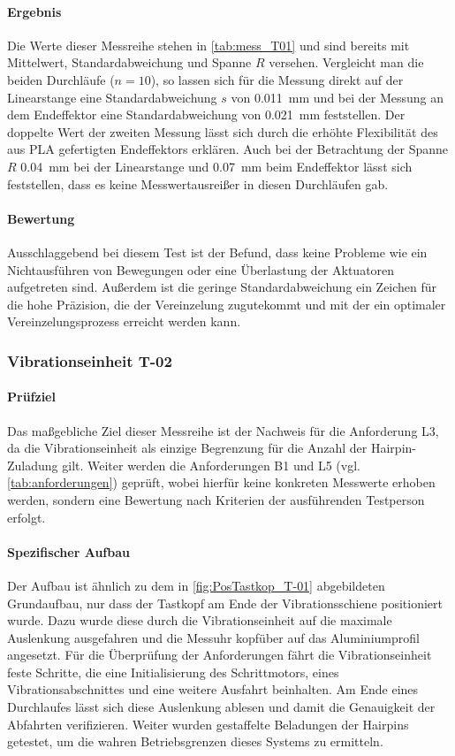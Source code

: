 \paragraph{Ergebnis}
Die Werte dieser Messreihe stehen in \cref{tab:mess_T01} und sind bereits mit Mittelwert, Standardabweichung und Spanne $R$ versehen.
Vergleicht man die beiden Durchläufe ($n = 10$), so lassen sich für die Messung direkt auf der Linearstange eine Standardabweichung $s$
von \qty{0.011}{\milli\meter} und bei der Messung an dem Endeffektor eine Standardabweichung von \qty{0.021}{\milli\meter} feststellen.
Der doppelte Wert der zweiten Messung lässt sich durch die erhöhte Flexibilität des aus PLA gefertigten Endeffektors erklären. Auch bei der
Betrachtung der Spanne $R$ \qty{0.04}{\milli\meter} bei der Linearstange und \qty{0.07}{\milli\meter} beim Endeffektor lässt sich
feststellen, dass es keine Messwertausreißer in diesen Durchläufen gab.

\paragraph{Bewertung}
Ausschlaggebend bei diesem Test ist der Befund, dass keine Probleme wie ein Nichtausführen von Bewegungen oder eine Überlastung
der Aktuatoren aufgetreten sind. Außerdem ist die geringe Standardabweichung ein Zeichen für die hohe Präzision,
die der Vereinzelung zugutekommt und mit der ein optimaler Vereinzelungsprozess erreicht werden kann.
%
\subsubsection{Vibrationseinheit T-02}

\paragraph{Prüfziel}
Das maßgebliche Ziel dieser Messreihe ist der Nachweis für die Anforderung L3, da die Vibrationseinheit als einzige Begrenzung für die
Anzahl der Hairpin-Zuladung gilt. Weiter werden die Anforderungen B1 und L5 (vgl. \cref{tab:anforderungen}) geprüft, wobei hierfür keine
konkreten Messwerte erhoben werden, sondern eine Bewertung nach Kriterien der ausführenden Testperson erfolgt.

\paragraph{Spezifischer Aufbau}
Der Aufbau ist ähnlich zu dem in \cref{fig:PosTastkop_T-01} abgebildeten Grundaufbau, nur dass der Tastkopf am Ende der Vibrationsschiene
positioniert wurde. Dazu wurde diese durch die Vibrationseinheit auf die maximale Auslenkung ausgefahren und die Messuhr kopfüber auf das Aluminiumprofil
angesetzt. Für die Überprüfung der Anforderungen fährt die Vibrationseinheit feste Schritte, die eine Initialisierung des Schrittmotors,
eines Vibrationsabschnittes und eine weitere Ausfahrt beinhalten. Am Ende eines Durchlaufes lässt sich diese Auslenkung ablesen
und damit die Genauigkeit der Abfahrten verifizieren. Weiter wurden gestaffelte Beladungen der Hairpins getestet, um die wahren 
Betriebsgrenzen dieses Systems zu ermitteln.

